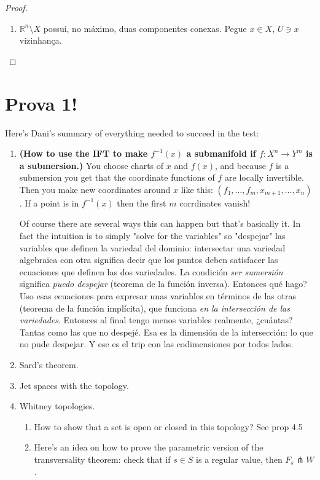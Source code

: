 \begin{proof}\leavevmode
\begin{enumerate}
\item  \(\mathbb{R}^n\setminus X\) possui, no máximo, duas componentes conexas. Pegue \(x \in X\), \(U \ni x\) vizinhança. 
\end{enumerate}
\end{proof}

\section*{Prova 1!}

Here's Dani's summary of everything needed to succeed in the test:

\begin{enumerate}
	\item \textbf{(How to use the IFT to make \(f^{-1}(x)\) a submanifold if \(f:X^n \to Y^m\) is a submersion.)} You choose charts of \(x\) and \(f(x)\), and because \(f\) is a submersion you get that the coordinate functions of \(f\) are locally invertible. Then you make new coordinates around \(x\) like this: \((f_1,\ldots,f_m,x_{m+1},\ldots,x_n)\). If a point is in \(f^{-1}(x)\) then the first \(m\) corrdinates vanish!

		Of course there are several ways this can happen but that's basically it. In fact the intuition is to simply "solve for the variables" so "despejar" las variables que definen la variedad del dominio: intersectar una variedad algebraica con otra significa decir que los puntos deben satisfacer las ecuaciones que definen las dos variedades. La condición \textit{ser sumersión} significa \textit{puedo despejar} (teorema de la función inversa). Entonces qué hago? Uso esas ecuaciones para expresar unas variables en términos de las otras (teorema de la función implícita), que funciona \textit{en la intersección de las variedades}. Entonces al final tengo menos variables realmente, ¿cuántas? Tantas como las que no despejé. Esa es la dimensión de la intersección: lo que no pude despejar. Y ese es el trip con las codimensiones por todos lados.

	\item Sard's theorem.

	\item Jet spaces with the topology.
	\item Whitney topologies.
		\begin{enumerate}
		\item How to show that a set is open or closed in this topology? See prop 4.5
		\item Here's an idea on how to prove the parametric version of the transversality theorem: check that if \(s \in S\) is a regular value, then \(F_s \pitchfork W\).


\end{enumerate}
\end{enumerate}

